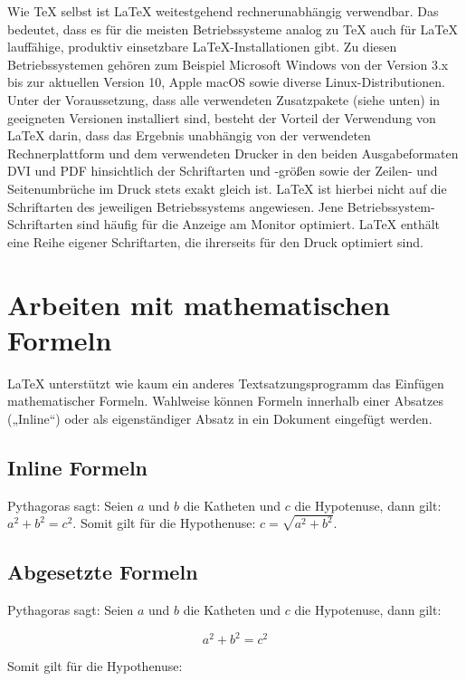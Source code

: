 \documentclass[ 12pt, a4paper, parskip=full]{scrartcl}
\begin{document}
Wie TeX selbst ist LaTeX weitestgehend rechnerunabhängig verwendbar. Das bedeutet, dass es für die meisten Betriebssysteme analog zu TeX auch für LaTeX lauffähige, produktiv einsetzbare LaTeX-Installationen gibt. Zu diesen Betriebssystemen gehören zum Beispiel Microsoft Windows von der Version 3.x bis zur aktuellen Version 10, Apple macOS sowie diverse Linux-Distributionen. Unter der Voraussetzung, dass alle verwendeten Zusatzpakete (siehe unten) in geeigneten Versionen installiert sind, besteht der Vorteil der Verwendung von LaTeX darin, dass das Ergebnis unabhängig von der verwendeten Rechnerplattform und dem verwendeten Drucker in den beiden Ausgabeformaten DVI und PDF hinsichtlich der Schriftarten und -größen sowie der Zeilen- und Seitenumbrüche im Druck stets exakt gleich ist. LaTeX ist hierbei nicht auf die Schriftarten des jeweiligen Betriebssystems angewiesen. Jene Betriebssystem-Schriftarten sind häufig für die Anzeige am Monitor optimiert. LaTeX enthält eine Reihe eigener Schriftarten, die ihrerseits für den Druck optimiert sind. 

\pagebreak
\section{Arbeiten mit mathematischen Formeln}
LaTeX unterstützt wie kaum ein anderes Textsatzungsprogramm das Einfügen mathematischer Formeln. Wahlweise können Formeln innerhalb einer Absatzes („Inline“) oder als eigenständiger Absatz in ein Dokument eingefügt werden.

\subsection{Inline Formeln}
Pythagoras sagt: Seien $a$ und $b$ die 
Katheten und $c$ die Hypotenuse, dann gilt: $a^2+b^2=c^2$. 
Somit gilt für die Hypothenuse: $c=\sqrt{a^2+b^2}$.

\subsection{Abgesetzte Formeln}
Pythagoras sagt: Seien $a$ und $b$ die Katheten und $c$ die
Hypotenuse, dann gilt: 

\begin{displaymath}
  a^2+b^2=c^2  
\end{displaymath}

Somit gilt für die Hypothenuse: 
\end{document}

